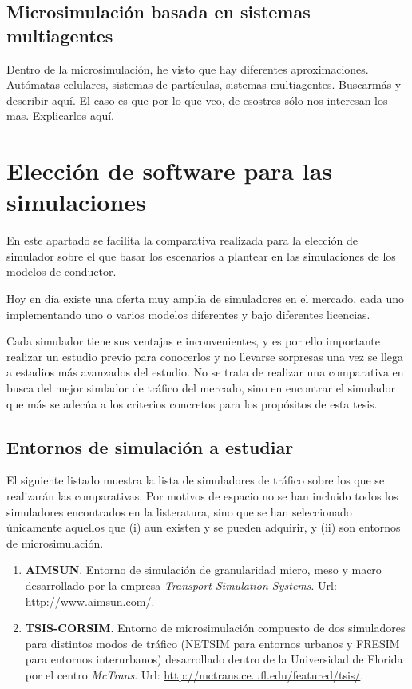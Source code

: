 \subsection{Microsimulación basada en sistemas multiagentes}

Dentro de la microsimulación, he visto que hay diferentes aproximaciones. Autómatas celulares, sistemas de partículas, sistemas multiagentes. Buscarmás y describir aquí. El caso es que por lo que veo, de esostres sólo nos interesan los mas. Explicarlos aquí.

\section{Elección de software para las simulaciones}

En este apartado se facilita la comparativa realizada para la elección de simulador sobre el que basar los escenarios a plantear en las simulaciones de los modelos de conductor.

Hoy en día existe una oferta muy amplia de simuladores en el mercado, cada uno implementando uno o varios modelos diferentes y bajo diferentes licencias.

Cada simulador tiene sus ventajas e inconvenientes, y es por ello importante realizar un estudio previo para conocerlos y no llevarse sorpresas una vez se llega a estadios más avanzados del estudio. No se trata de realizar una comparativa en busca del mejor simlador de tráfico del mercado, sino en encontrar el simulador que más se adecúa a los criterios concretos para los propósitos de esta tesis.

\subsection{Entornos de simulación a estudiar}

El siguiente listado muestra la lista de simuladores de tráfico sobre los que se realizarán las comparativas. Por motivos de espacio no se han incluido todos los simuladores encontrados en la listeratura, sino que se han seleccionado únicamente aquellos que (i) aun existen y se pueden adquirir, y (ii) son entornos de microsimulación.

\begin{enumerate}
	\item \textbf{AIMSUN}. Entorno de simulación de granularidad micro, meso y macro desarrollado por la empresa \textit{Transport Simulation Systems}. Url: \url{http://www.aimsun.com/}.
	\item \textbf{TSIS-CORSIM}. Entorno de microsimulación compuesto de dos simuladores para distintos modos de tráfico (NETSIM para entornos urbanos y FRESIM para entornos interurbanos) desarrollado dentro de la Universidad de Florida por el centro \textit{McTrans}. Url: \url{http://mctrans.ce.ufl.edu/featured/tsis/}.
\end{enumerate}

